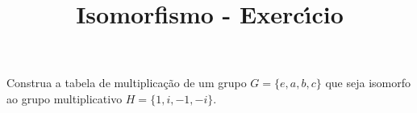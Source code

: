 \documentclass{beamer}
\title{Isomorfismo - Exerc{\'\i}cio}
\author[\autor]{\autor}
\institute[\instituto]{\instituto}
\date{}
\begin{document}


    \begin{frame}
        \begin{exercicio}
            Construa a tabela de multiplica\c{c}\~ao de um grupo $G = \{e, a, b, c\}$ que seja isomorfo ao grupo multiplicativo $H = \{1, i, -1, -i\}$.
        \end{exercicio}
    \end{frame}
\end{document}
